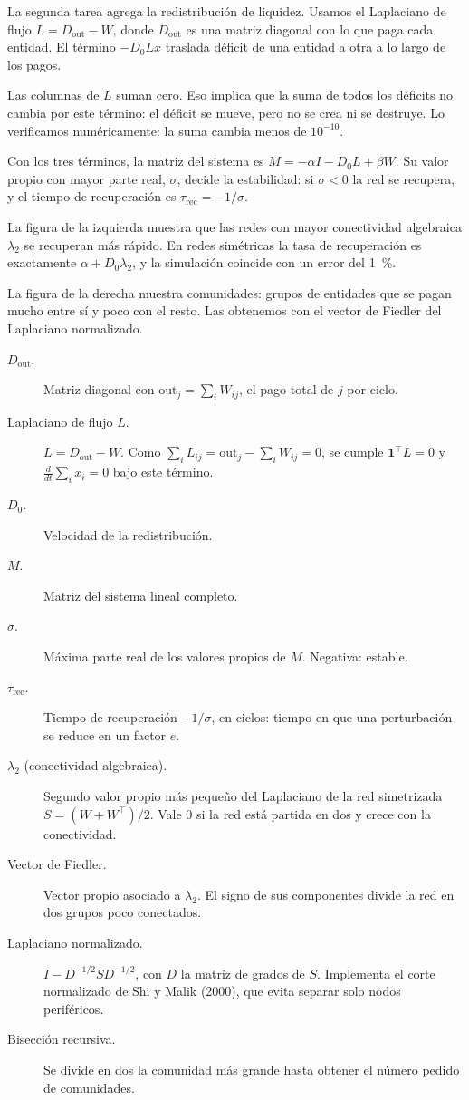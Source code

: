\begin{decir}
La segunda tarea agrega la redistribución de liquidez. Usamos el Laplaciano de flujo
$L=D_\text{out}-W$, donde $D_\text{out}$ es una matriz diagonal con lo que paga cada
entidad. El término $-D_0Lx$ traslada déficit de una entidad a otra a lo largo de los
pagos.

Las columnas de $L$ suman cero. Eso implica que la suma de todos los déficits no cambia
por este término: el déficit se mueve, pero no se crea ni se destruye. Lo verificamos
numéricamente: la suma cambia menos de $10^{-10}$.

Con los tres términos, la matriz del sistema es $M=-\alpha I-D_0L+\beta W$. Su valor
propio con mayor parte real, $\sigma$, decide la estabilidad: si $\sigma<0$ la red se
recupera, y el tiempo de recuperación es $\tau_\text{rec}=-1/\sigma$.

La figura de la izquierda muestra que las redes con mayor conectividad algebraica
$\lambda_2$ se recuperan más rápido. En redes simétricas la tasa de recuperación es
exactamente $\alpha+D_0\lambda_2$, y la simulación coincide con un error del 1~\%.

La figura de la derecha muestra comunidades: grupos de entidades que se pagan mucho
entre sí y poco con el resto. Las obtenemos con el vector de Fiedler del Laplaciano
normalizado.
\end{decir}
\begin{terminos}
\begin{description}
\item[$D_\text{out}$.] Matriz diagonal con $\mathrm{out}_j=\sum_iW_{ij}$, el pago total
de $j$ por ciclo.
\item[Laplaciano de flujo $L$.] $L=D_\text{out}-W$. Como $\sum_iL_{ij}=\mathrm{out}_j-
\sum_iW_{ij}=0$, se cumple $\mathbf 1^\top L=0$ y $\frac{d}{dt}\sum_ix_i=0$ bajo este
término.
\item[$D_0$.] Velocidad de la redistribución.
\item[$M$.] Matriz del sistema lineal completo.
\item[$\sigma$.] Máxima parte real de los valores propios de $M$. Negativa: estable.
\item[$\tau_\text{rec}$.] Tiempo de recuperación $-1/\sigma$, en ciclos: tiempo en que
una perturbación se reduce en un factor $e$.
\item[$\lambda_2$ (conectividad algebraica).] Segundo valor propio más pequeño del
Laplaciano de la red simetrizada $S=(W+W^\top)/2$. Vale 0 si la red está partida en
dos y crece con la conectividad.
\item[Vector de Fiedler.] Vector propio asociado a $\lambda_2$. El signo de sus
componentes divide la red en dos grupos poco conectados.
\item[Laplaciano normalizado.] $I-D^{-1/2}SD^{-1/2}$, con $D$ la matriz de grados de
$S$. Implementa el corte normalizado de Shi y Malik (2000), que evita separar solo
nodos periféricos.
\item[Bisección recursiva.] Se divide en dos la comunidad más grande hasta obtener el
número pedido de comunidades.
\end{description}
\end{terminos}
